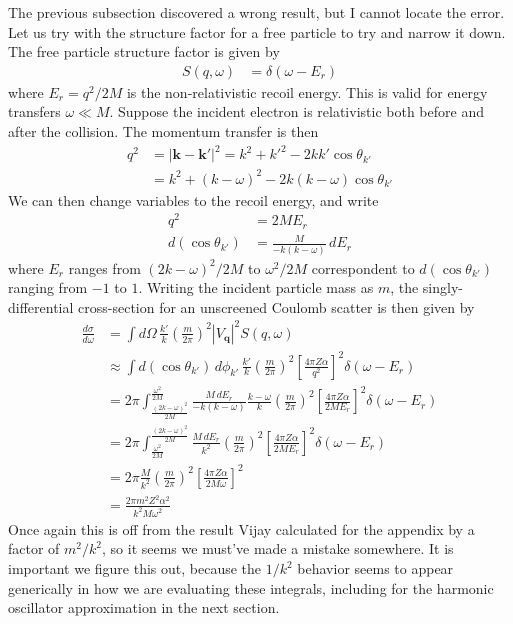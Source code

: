\documentclass{article}
\begin{document}
The previous subsection discovered a wrong result, but I cannot locate the error. Let us try with the structure factor for a free particle to try and narrow it down. The free particle structure factor is given by
\begin{align}
S(q, \omega) &= \delta\left( \omega - E_r \right)
\end{align}
where $E_r = q^2 / 2 M$ is the non-relativistic recoil energy. This is valid for energy transfers $\omega \ll M$. Suppose the incident electron is relativistic both before and after the collision. The momentum transfer is then
\begin{align}
q^2 &= |\textbf{k} - \textbf{k}'|^2 = k^2 + k'^2 - 2 kk'\cos\theta_{k'} \nonumber\\
  &= k^2 + (k - \omega)^2 - 2 k(k - \omega)\cos\theta_{k'} \label{eq:RelativisticMomentumTransfer}
\end{align}
We can then change variables to the recoil energy, and write
\begin{align}
q^2 &= 2 ME_r \\
d(\cos\theta_{k'}) &= \frac{M}{-k(k - \omega)}\,dE_r
\end{align}
where $E_r$ ranges from $(2 k - \omega)^2 / 2 M$ to $\omega^2 / 2 M$ correspondent to $d(\cos\theta_{k'})$ ranging from $-1$ to $1$.
Writing the incident particle mass as $m$, the singly-differential cross-section for an unscreened Coulomb scatter is then given by
\begin{align}
  \frac{d \sigma}{d \omega} &= \int d \Omega\, \frac{k'}{k} \left( \frac{m}{2 \pi} \right)^2 |V_\textbf{q}|^2 S(q, \omega)  \nonumber\\
     &\approx \int d(\cos\theta_{k'})\, d \phi_{k'}\, \frac{k'}{k} \left( \frac{m}{2 \pi} \right)^2 \left[ \frac{4 \pi Z\alpha}{q^2} \right]^2 \delta(\omega - E_r) \nonumber\\
     &= 2 \pi \int_{\frac{(2 k - \omega)^2}{2 M}}^{\frac{\omega^2}{2 M}} \frac{M\, dE_r}{-k(k - \omega)} \frac{k - \omega}{k} \left( \frac{m}{2 \pi} \right)^2 \left[ \frac{4 \pi Z\alpha}{2 M E_r} \right]^2 \delta(\omega - E_r) \nonumber\\
     &= 2 \pi \int^{\frac{(2 k - \omega)^2}{2 M}}_{\frac{\omega^2}{2 M}} \frac{M\, dE_r}{k^2} \left( \frac{m}{2 \pi} \right)^2 \left[ \frac{4 \pi Z\alpha}{2 M E_r} \right]^2 \delta(\omega - E_r) \nonumber\\
     &= 2 \pi  \frac{M}{k^2} \left( \frac{m}{2 \pi} \right)^2 \left[ \frac{4 \pi Z\alpha}{2 M \omega} \right]^2 \nonumber\\
     &= \frac{2 \pi m^2 Z^2 \alpha^2}{k^2 M\omega^2}
\end{align}
Once again this is off from the result Vijay calculated for the appendix by a factor of $m^2 / k^2$, so it seems we must've made a mistake somewhere. It is important we figure this out, because the $1/k^2$ behavior seems to appear generically in how we are evaluating these integrals, including for the harmonic oscillator approximation in the next section.
\end{document}
